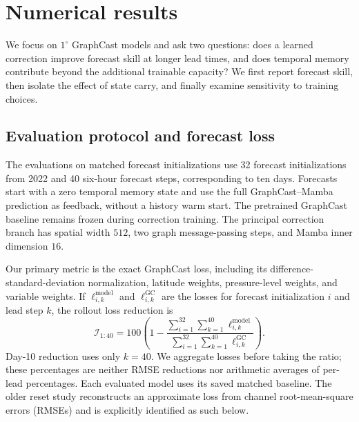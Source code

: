 \documentclass{article}
\newcommand{\suozhi}[1]{\textcolor{blue}{[suozhi: #1]}}
\renewcommand{\suozhi}[1]{}
\begin{document}
\section{Numerical results}
\label{sec:numerical}
We focus on $1^\circ$ GraphCast models and ask two questions: does a learned correction improve forecast skill at longer lead times, and does temporal memory contribute beyond the additional trainable capacity? We first report forecast skill, then isolate the effect of state carry, and finally examine sensitivity to training choices.

\subsection{Evaluation protocol and forecast loss}
\suozhi{Please add a compact experiment overview table listing the model, forecast starts, verification grid, and metric for each study. Clearly separate the exact GraphCast loss evaluations, the approximate reconstructed loss, and the historical comparison across resolutions. Readers should not assume that every figure uses the same model and evaluation protocol. Consistently distinguish loss reduction from RMSE reduction.}

The evaluations on matched forecast initializations use 32 forecast initializations from 2022 and 40 six-hour forecast steps, corresponding to ten days. Forecasts start with a zero temporal memory state and use the full GraphCast--Mamba prediction as feedback, without a history warm start. The pretrained GraphCast baseline remains frozen during correction training. The principal correction branch has spatial width $512$, two graph message-passing steps, and Mamba inner dimension $16$.

Our primary metric is the exact GraphCast loss, including its difference-standard-deviation normalization, latitude weights, pressure-level weights, and variable weights. If $\ell_{i,k}^{\mathrm{model}}$ and $\ell_{i,k}^{\mathrm{GC}}$ are the losses for forecast initialization $i$ and lead step $k$, the rollout loss reduction is
\begin{equation}
    \mathcal{I}_{1:40}
    =100\left(1-
      \frac{\sum_{i=1}^{32}\sum_{k=1}^{40}\ell_{i,k}^{\mathrm{model}}}
           {\sum_{i=1}^{32}\sum_{k=1}^{40}\ell_{i,k}^{\mathrm{GC}}}
    \right).
    \label{eq:rollout_reduction}
\end{equation}
Day-10 reduction uses only $k=40$. We aggregate losses before taking the ratio; these percentages are neither RMSE reductions nor arithmetic averages of per-lead percentages. Each evaluated model uses its saved matched baseline. The older reset study reconstructs an approximate loss from channel root-mean-square errors (RMSEs) and is explicitly identified as such below.
\end{document}
